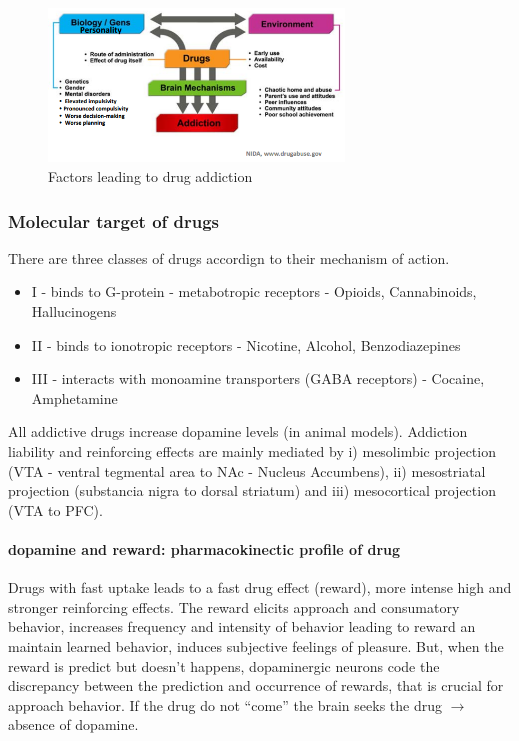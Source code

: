 \documentclass[12pt,article,oneside,a4paper]{memoir}
\begin{document}
\begin{figure}
  \centering
  \includegraphics[width=0.7\textwidth]{imgs/drug-addiction-factors.png}
  \caption{Factors leading to drug addiction}
  \label{fig:drug-addiction-factors}
\end{figure}

\subsubsection{Molecular target of drugs}
There are three classes of drugs accordign to their mechanism of action.

\begin{itemize}
\item I - binds to G-protein - metabotropic receptors - Opioids, Cannabinoids,
Hallucinogens
\item II - binds to ionotropic receptors - Nicotine, Alcohol, Benzodiazepines
\item III - interacts with monoamine transporters (GABA receptors) - Cocaine, Amphetamine
\end{itemize}

All addictive drugs increase dopamine levels (in animal models). Addiction
liability and reinforcing effects are mainly mediated by i) mesolimbic
projection (VTA - ventral tegmental area to NAc - Nucleus Accumbens), ii)
mesostriatal projection (substancia nigra to dorsal striatum) and iii)
mesocortical projection (VTA to PFC).

\paragraph{dopamine and reward: pharmacokinectic profile of drug}
Drugs with fast uptake leads to a fast drug effect (reward), more intense high
and stronger reinforcing effects.
The reward elicits approach and consumatory behavior, increases frequency and
intensity of behavior leading to reward an maintain learned behavior, induces
subjective feelings of pleasure. But, when the reward is predict but doesn't
happens, dopaminergic neurons code the discrepancy between the prediction and
occurrence of rewards, that is crucial for approach behavior. If the drug do
not ``come'' the brain seeks the drug $\rightarrow$ absence of dopamine.
\end{document}
